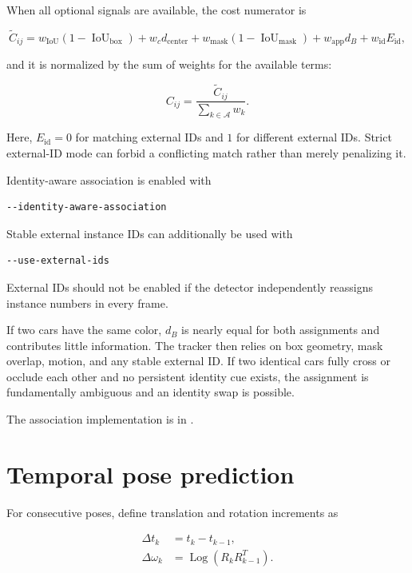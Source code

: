 \documentclass[11pt]{article}
\newcommand{\Log}{\operatorname{Log}}
\newcommand{\IoU}{\operatorname{IoU}}
\begin{document}
When all optional signals are available, the cost numerator is

\begin{equation}
\widetilde C_{ij}=
w_{\mathrm{IoU}}(1-\IoU_{\mathrm{box}})
+w_cd_{\mathrm{center}}
+w_{\mathrm{mask}}(1-\IoU_{\mathrm{mask}})
+w_{\mathrm{app}}d_B
+w_{\mathrm{id}}E_{\mathrm{id}},
\end{equation}

and it is normalized by the sum of weights for the available terms:

\begin{equation}
C_{ij}=\frac{\widetilde C_{ij}}{\sum_{k\in\mathcal A}w_k}.
\end{equation}

Here, $E_{\mathrm{id}}=0$ for matching external IDs and $1$ for different
external IDs. Strict external-ID mode can forbid a conflicting match rather
than merely penalizing it.

Identity-aware association is enabled with

\begin{verbatim}
--identity-aware-association
\end{verbatim}

Stable external instance IDs can additionally be used with

\begin{verbatim}
--use-external-ids
\end{verbatim}

External IDs should not be enabled if the detector independently reassigns
instance numbers in every frame.

If two cars have the same color, $d_B$ is nearly equal for both assignments
and contributes little information. The tracker then relies on box geometry,
mask overlap, motion, and any stable external ID. If two identical cars fully
cross or occlude each other and no persistent identity cue exists, the
assignment is fundamentally ambiguous and an identity swap is possible.

The association implementation is in .

\section{Temporal pose prediction}

For consecutive poses, define translation and rotation increments as

\begin{align}
\Delta t_k &= t_k-t_{k-1},\\
\Delta\omega_k &= \Log\left(R_kR_{k-1}^T\right).
\end{align}
\end{document}
